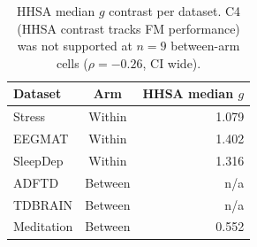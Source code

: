 \begin{table}[t]
\centering
\caption{HHSA median $g$ contrast per dataset. C4 (HHSA contrast tracks FM performance) was not supported at $n=9$ between-arm cells ($\rho=-0.26$, CI wide).}
\label{tab:hhsa_raw}
\begin{tabular}{lcr}
\toprule
Dataset & Arm & HHSA median $g$ \\
\midrule
Stress & Within & 1.079 \\
EEGMAT & Within & 1.402 \\
SleepDep & Within & 1.316 \\
ADFTD & Between & n/a \\
TDBRAIN & Between & n/a \\
Meditation & Between & 0.552 \\
\bottomrule
\end{tabular}
\end{table}
